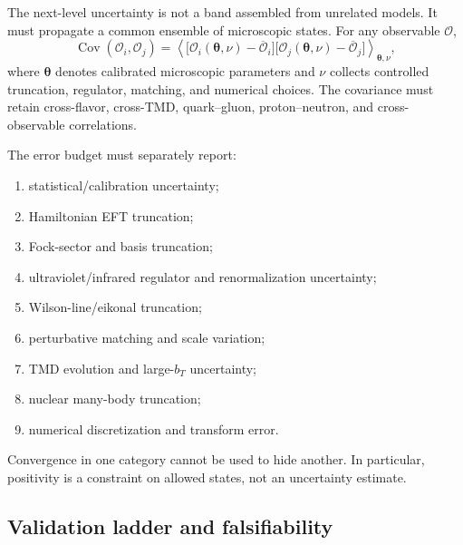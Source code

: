 \documentclass[11pt]{article}
\begin{document}
The next-level uncertainty is not a band assembled from unrelated models.
It must propagate a common ensemble of microscopic states.  For any
observable \(\mathcal O\),
\begin{equation}
\operatorname{Cov}(\mathcal O_i,\mathcal O_j)
=\left\langle
\big[\mathcal O_i(\bm\theta,\nu)-\overline{\mathcal O}_i\big]
\big[\mathcal O_j(\bm\theta,\nu)-\overline{\mathcal O}_j\big]
\right\rangle_{\bm\theta,\nu},
\label{eq:predictive-covariance}
\end{equation}
where \(\bm\theta\) denotes calibrated microscopic parameters and \(\nu\)
collects controlled truncation, regulator, matching, and numerical choices.
The covariance must retain cross-flavor, cross-TMD, quark--gluon,
proton--neutron, and cross-observable correlations.

The error budget must separately report:
\begin{enumerate}
  \item statistical/calibration uncertainty;
  \item Hamiltonian EFT truncation;
  \item Fock-sector and basis truncation;
  \item ultraviolet/infrared regulator and renormalization uncertainty;
  \item Wilson-line/eikonal truncation;
  \item perturbative matching and scale variation;
  \item TMD evolution and large-\(b_T\) uncertainty;
  \item nuclear many-body truncation;
  \item numerical discretization and transform error.
\end{enumerate}
Convergence in one category cannot be used to hide another.  In particular,
positivity is a constraint on allowed states, not an uncertainty estimate.

\subsection{Validation ladder and falsifiability}
\end{document}
